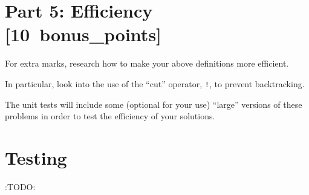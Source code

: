 \documentclass[11pt]{article}
\begin{document}
\section*{Part 5: Efficiency                                     [10 bonus\_points]}
\label{sec:orga62d956}

For extra marks, research how to make your above definitions more efficient.

In particular, look into the use of the “cut” operator, \texttt{!},
to prevent backtracking.

The unit tests will include some (optional for your use) “large”
versions of these problems in order to test the efficiency
of your solutions.

\section*{Testing}
\label{sec:org5f31930}
:TODO:
\end{document}
